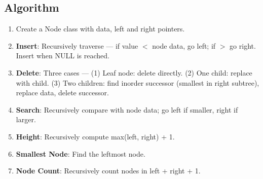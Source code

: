 \documentclass[a4paper,12pt]{article}
\begin{document}
\subsection*{Algorithm}
\begin{enumerate}
    \item Create a Node class with data, left and right pointers.
    \item \textbf{Insert}: Recursively traverse — if value $<$ node data, go left; if $>$ go right. Insert when NULL is reached.
    \item \textbf{Delete}: Three cases — (1) Leaf node: delete directly. (2) One child: replace with child. (3) Two children: find inorder successor (smallest in right subtree), replace data, delete successor.
    \item \textbf{Search}: Recursively compare with node data; go left if smaller, right if larger.
    \item \textbf{Height}: Recursively compute max(left, right) + 1.
    \item \textbf{Smallest Node}: Find the leftmost node.
    \item \textbf{Node Count}: Recursively count nodes in left + right + 1.
\end{enumerate}
\end{document}
